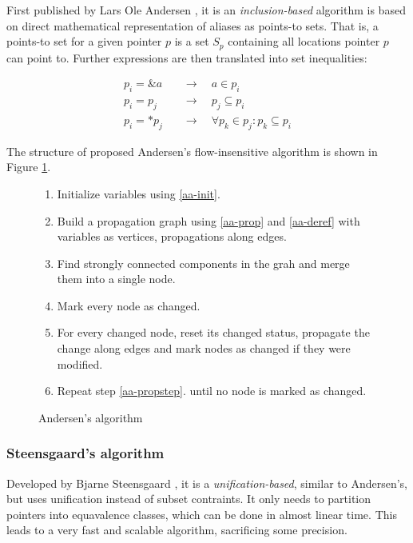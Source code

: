 First published by Lars Ole Andersen \cite{Andersen94}, it is an {\it
inclusion-based} algorithm is based on direct mathematical representation of
aliases as points-to sets. That is, a points-to set for a given pointer $p$ is a
set $S_p$ containing all locations pointer $p$ can point to.  Further
expressions are then translated into set inequalities:

\begin{align}
	\label{aa-init}
	p_i = \&a \quad &\to \quad a \in p_i \\
	\label{aa-prop}
	p_i = p_j \quad &\to \quad p_j \subseteq p_i \\
	\label{aa-deref}
	p_i = *p_j \quad &\to \quad \forall p_k \in p_j : p_k \subseteq p_i
\end{align}

The structure of proposed Andersen's flow-insensitive algorithm is shown in Figure
\ref{figure-andersen}.

\begin{figure}[h!]
\begin{tcolorbox}
\begin{enumerate}
	\item Initialize variables using \ref{aa-init}.
	\item Build a propagation graph using \ref{aa-prop} and \ref{aa-deref}
		with variables as vertices, propagations along edges.
	\item Find strongly connected components in the grah and merge them into a single node.
	\item Mark every node as changed.
	\item For every changed node, reset its changed status, propagate the change
		along edges and mark nodes as changed if they were modified.
	\label{aa-propstep} 
	\item Repeat step \ref{aa-propstep}. until no node is marked as changed.
\end{enumerate}
\end{tcolorbox}
\caption{Andersen's algorithm}
\label{figure-andersen}
\end{figure}

\subsubsection{Steensgaard's algorithm}

Developed by Bjarne Steensgaard \cite{Steensgaard96}, it is  a {\it
unification-based}, similar to Andersen's, but uses unification instead of
subset contraints. It only needs to partition pointers into equavalence
classes, which can be done in almost linear time. This leads to a very fast and
scalable algorithm, sacrificing some precision.

